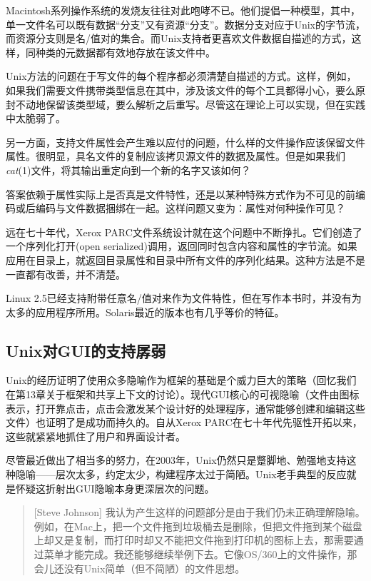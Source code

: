 \documentclass[12pt,oneside]{book}
\begin{document}
Macintosh系列操作系统的发烧友往往对此咆哮不已。他们提倡一种模型，其中，单一文件名可以既有数据“分支”又有资源“分支”。数据分支对应于Unix的字节流，而资源分支则是名/值对的集合。而Unix支持者更喜欢文件数据自描述的方式，这样，同种类的元数据都有效地存放在该文件中。

Unix方法的问题在于写文件的每个程序都必须清楚自描述的方式。这样，例如，如果我们需要文件携带类型信息在其中，涉及该文件的每个工具都得小心，要么原封不动地保留该类型域，要么解析之后重写。尽管这在理论上可以实现，但在实践中太脆弱了。

另一方面，支持文件属性会产生难以应付的问题，什么样的文件操作应该保留文件属性。很明显，具名文件的复制应该拷贝源文件的数据及属性。但是如果我们\textit{cat}(1)文件，将其输出重定向到一个新的名字又该如何？

答案依赖于属性实际上是否真是文件特性，还是以某种特殊方式作为不可见的前编码或后编码与文件数据捆绑在一起。这样问题又变为：属性对何种操作可见？

远在七十年代，Xerox PARC文件系统设计就在这个问题中不断挣扎。它们创造了一个序列化打开(open serialized)调用，返回同时包含内容和属性的字节流。如果应用在目录上，就返回目录属性和目录中所有文件的序列化结果。这种方法是不是一直都有改善，并不清楚。

Linux 2.5已经支持附带任意名/值对来作为文件特性，但在写作本书时，并没有为太多的应用程序所用。Solaris最近的版本也有几乎等价的特征。

\subsection{Unix对GUI的支持孱弱}
Unix的经历证明了使用众多隐喻作为框架的基础是个威力巨大的策略（回忆我们在第13章关于框架和共享上下文的讨论）。现代GUI核心的可视隐喻（文件由图标表示，打开靠点击，点击会激发某个设计好的处理程序，通常能够创建和编辑这些文件）也证明了是成功而持久的。自从Xerox PARC在七十年代先驱性开拓以来，这些就紧紧地抓住了用户和界面设计者。

尽管最近做出了相当多的努力，在2003年，Unix仍然只是蹩脚地、勉强地支持这种隐喻——层次太多，约定太少，构建程序太过于简陋。Unix老手典型的反应就是怀疑这折射出GUI隐喻本身更深层次的问题。

\begin{quote}[Steve Johnson]
我认为产生这样的问题部分是由于我们仍未正确理解隐喻。例如，在Mac上，把一个文件拖到垃圾桶去是删除，但把文件拖到某个磁盘上却又是复制，而打印时却又不能把文件拖到打印机的图标上去，那需要通过菜单才能完成。我还能够继续举例下去。它像OS/360上的文件操作，那会儿还没有Unix简单（但不简陋）的文件思想。
\end{quote}
\end{document}
